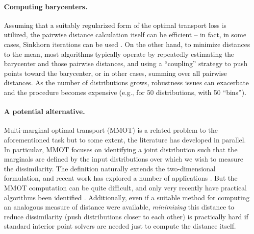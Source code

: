\paragraph{Computing barycenters.}
Assuming that a suitably regularized form of the optimal transport loss is utilized, the pairwise distance 
calculation itself can be efficient -- in fact, 
in some cases, Sinkhorn iterations can be used \citep{cuturi2013sinkhorn}. 
On the other hand, to minimize distances to the mean, 
most algorithms typically operate 
by repeatedly estimating the barycenter and those pairwise distances, and using a ``coupling'' strategy 
to push points toward the barycenter,
or in other cases, summing over all pairwise 
distances. 
As the number of distributions 
grows, robustness issues can exacerbate \citep{alvarez2008trimmed,le2021robust} and the procedure becomes
expensive (e.g., for 50 distributions, with 50 ``bins'').

\paragraph{A potential alternative.}
Multi-marginal optimal transport (MMOT) is a related problem to the aforementioned task but to some extent, the literature has developed in parallel.
In particular, MMOT focuses on identifying a joint distribution such that the marginals are defined by the input distributions over which we wish to measure the dissimilarity.
The definition naturally extends the two-dimensional formulation, and recent work has explored a number of applications \citep{pass2015multi}.
But the MMOT computation can be quite difficult,
and only very recently have practical algorithms been identified \citep{mmotcuturi}.
Additionally, even if a suitable method for computing an analogous measure of distance were available, 
\textit{minimizing} this distance to reduce 
dissimilarity (push distributions closer to each other) is practically hard if standard interior point solvers are needed just to compute the distance itself.

